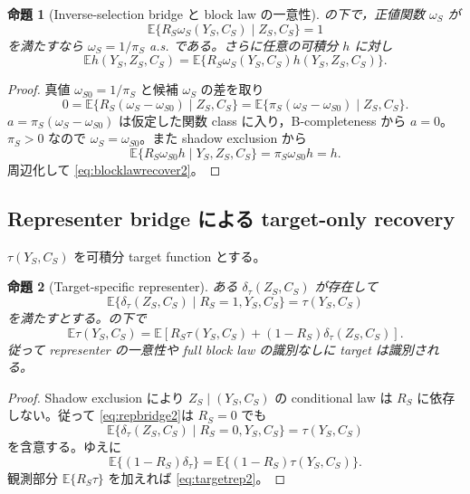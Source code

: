 \documentclass[11pt,a4paper]{ltjsarticle}
\newtheorem{proposition}{命題}[section]
\theoremstyle{remark}
\newcommand{\E}{\mathbb E}
\begin{document}
\begin{proposition}[Inverse-selection bridge と block law の一意性]\label{prop:uniquebridge2}
の下で，正値関数 $\omega_S$ が
\[
\E\{R_S\omega_S(Y_S,C_S)\mid Z_S,C_S\}=1
\]
を満たすなら $\omega_S=1/\pi_S$ a.s. である。さらに任意の可積分 $h$ に対し
\begin{equation}
\E h(Y_S,Z_S,C_S)
=\E\{R_S\omega_S(Y_S,C_S)h(Y_S,Z_S,C_S)\}.
\label{eq:blocklawrecover2}
\end{equation}
\end{proposition}

\begin{proof}
真値 $\omega_{S0}=1/\pi_S$ と候補 $\omega_S$ の差を取り
\[
0=\E\{R_S(\omega_S-\omega_{S0})\mid Z_S,C_S\}
=\E\{\pi_S(\omega_S-\omega_{S0})\mid Z_S,C_S\}.
\]
$a=\pi_S(\omega_S-\omega_{S0})$ は仮定した関数 class に入り，B-completeness から $a=0$。$\pi_S>0$ なので $\omega_S=\omega_{S0}$。また shadow exclusion から
\[
\E\{R_S\omega_{S0}h\mid Y_S,Z_S,C_S\}
=\pi_S\omega_{S0}h=h.
\]
周辺化して \eqref{eq:blocklawrecover2}。
\end{proof}

\subsection{Representer bridge による target-only recovery}
$\tau(Y_S,C_S)$ を可積分 target function とする。

\begin{proposition}[Target-specific representer]\label{prop:representer2}
ある $\delta_\tau(Z_S,C_S)$ が存在して
\begin{equation}
\E\{\delta_\tau(Z_S,C_S)\mid R_S=1,Y_S,C_S\}
=\tau(Y_S,C_S)
\label{eq:repbridge2}
\end{equation}
を満たすとする。の下で
\begin{equation}
\E\tau(Y_S,C_S)
=\E\left[
R_S\tau(Y_S,C_S)
+(1-R_S)\delta_\tau(Z_S,C_S)
\right].
\label{eq:targetrep2}
\end{equation}
従って representer の一意性や full block law の識別なしに target は識別される。
\end{proposition}

\begin{proof}
Shadow exclusion により $Z_S\mid(Y_S,C_S)$ の conditional law は $R_S$ に依存しない。従って \eqref{eq:repbridge2}は $R_S=0$ でも
\[
\E\{\delta_\tau(Z_S,C_S)\mid R_S=0,Y_S,C_S\}
=\tau(Y_S,C_S)
\]
を含意する。ゆえに
\[
\E\{(1-R_S)\delta_\tau\}
=\E\{(1-R_S)\tau(Y_S,C_S)\}.
\]
観測部分 $\E\{R_S\tau\}$ を加えれば \eqref{eq:targetrep2}。
\end{proof}
\end{document}
